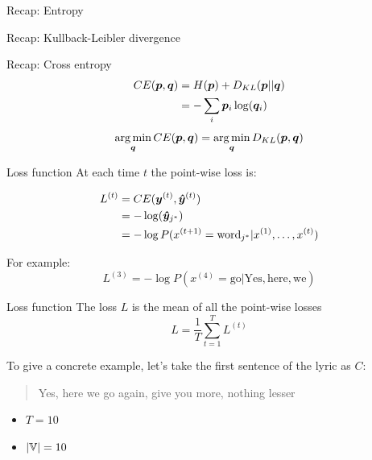 \documentclass[10pt]{beamer}
\begin{document}
\begin{frame}{Recap: Entropy}

\end{frame}

\begin{frame}{Recap: Kullback-Leibler divergence}

\end{frame}

\begin{frame}{Recap: Cross entropy}
\Large{
\begin{align*}
CE(\vect{p},\vect{q}) &= H(\vect{p}) + D_{KL}(\vect{p}||\vect{q})\\
\vspace{0.2cm}
&= -\sum_{i}\vect{p}_{i}\log(\vect{q}_{i})
\end{align*}
}
\vspace{0.2cm}
\begin{equation*}
\operatorname*{arg\,min}_{\bm{q}} CE(\bm{p},\bm{q}) =  \operatorname*{arg\,min}_{\bm{q}} D_{KL}(\bm{p},\bm{q})
\end{equation*}
\end{frame}


\begin{frame}{Loss function}
At each time $t$ the point-wise loss is:

\vspace{0.2cm}

\begin{align*}
L^{(t)} &= CE(\bm{y}^{(t)},\bm{\hat{y}}^{(t)})\\
    &= - \log(\bm{\hat{y}}_{j^{*}})\\
        &= - \log P(x^{(t+1)} = \text{word}_{j^{*}}|x^{(1)}, \dots, x^{(t)})
\end{align*}

 \vspace{0.2cm}

For example:
\begin{equation*}
L^{(3)}=- \log P(x^{(4)} = \text{go}| \text{Yes}, \text{here}, \text{we})
\end{equation*}
\end{frame}


\begin{frame}{Loss function}
The loss $L$ is the mean of all the point-wise losses
\begin{equation*}
L=\frac{1}{T}\sum_{t=1}^{T}L^{(t)}
\end{equation*}

To give a concrete example, let's take the first sentence of the lyric as $C$:
\begin{quote}
\alert{Yes, here we go again, give you more, nothing lesser}
\end{quote}

\begin{itemize}
\item $T = 10$
\item $|\mathbb{V}| = 10$
\end{itemize}

\end{frame}
\end{document}

